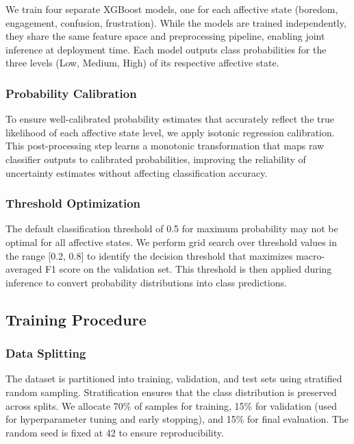 \documentclass[11pt,a4paper]{article}
\begin{document}
We train four separate XGBoost models, one for each affective state (boredom, engagement, confusion, frustration). While the models are trained independently, they share the same feature space and preprocessing pipeline, enabling joint inference at deployment time. Each model outputs class probabilities for the three levels (Low, Medium, High) of its respective affective state.

\subsubsection{Probability Calibration}

To ensure well-calibrated probability estimates that accurately reflect the true likelihood of each affective state level, we apply isotonic regression calibration. This post-processing step learns a monotonic transformation that maps raw classifier outputs to calibrated probabilities, improving the reliability of uncertainty estimates without affecting classification accuracy.

\subsubsection{Threshold Optimization}

The default classification threshold of 0.5 for maximum probability may not be optimal for all affective states. We perform grid search over threshold values in the range [0.2, 0.8] to identify the decision threshold that maximizes macro-averaged F1 score on the validation set. This threshold is then applied during inference to convert probability distributions into class predictions.

\subsection{Training Procedure}

\subsubsection{Data Splitting}

The dataset is partitioned into training, validation, and test sets using stratified random sampling. Stratification ensures that the class distribution is preserved across splits. We allocate 70\% of samples for training, 15\% for validation (used for hyperparameter tuning and early stopping), and 15\% for final evaluation. The random seed is fixed at 42 to ensure reproducibility.
\end{document}
